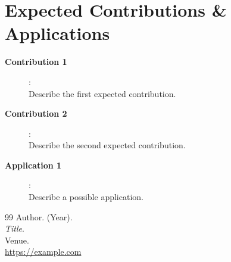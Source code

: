 \documentclass[11pt]{article}
\begin{document}
	\section*{Expected Contributions \& Applications}
	
	\begin{description}
		\item[\textbf{Contribution 1}]: \\
		Describe the first expected contribution.
		
		\item[\textbf{Contribution 2}]: \\
		Describe the second expected contribution.
		
		\item[\textbf{Application 1}]: \\
		Describe a possible application.
	\end{description}
	
	\begin{thebibliography}{99}
		Author. (Year). \\
		\textit{Title}. \\
		Venue. \\
		\url{https://example.com}
	\end{thebibliography}
	
\end{document}
